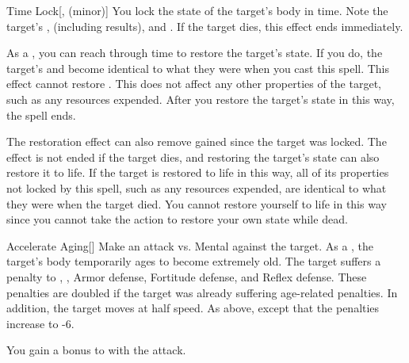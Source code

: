 \lowercase{\hypertarget{spell:Time Lock}{}}\label{spell:Time Lock}
\begin{freeability}[Rank 4]{\hypertarget{spell:Time Lock}{Time Lock}}[,  (minor)]
You lock the state of the target's body in time.
Note the target's ,  (including  results), and .
If the target dies, this effect ends immediately.

As a , you can reach through time to restore the target's state.
If you do, the target's  and  become identical to what they were when you cast this spell.
This effect cannot restore .
This does not affect any other properties of the target, such as any resources expended.
After you restore the target's state in this way, the spell ends.

\rankline
{} The restoration effect can also remove  gained since the target was locked.
 The effect is not ended if the target dies, and restoring the target's state can also restore it to life.
If the target is restored to life in this way, all of its properties not locked by this spell, such as any resources expended, are identical to what they were when the target died.
You cannot restore yourself to life in this way since you cannot take the action to restore your own state while dead.
\end{freeability}
\vspace{0.25em}



\lowercase{\hypertarget{spell:Accelerate Aging}{}}\label{spell:Accelerate Aging}
\begin{freeability}[Rank 5]{\hypertarget{spell:Accelerate Aging}{Accelerate Aging}}[]
Make an attack vs. Mental against the target.
\hit As a , the target's body temporarily ages to become extremely old.
The target suffers a  penalty to , , Armor defense, Fortitude defense, and Reflex defense.
These penalties are doubled if the target was already suffering age-related penalties.
In addition, the target moves at half speed.
\crit As above, except that the penalties increase to -6.

\rankline
{} You gain a  bonus to  with the attack.
\end{freeability}
\vspace{0.25em}



